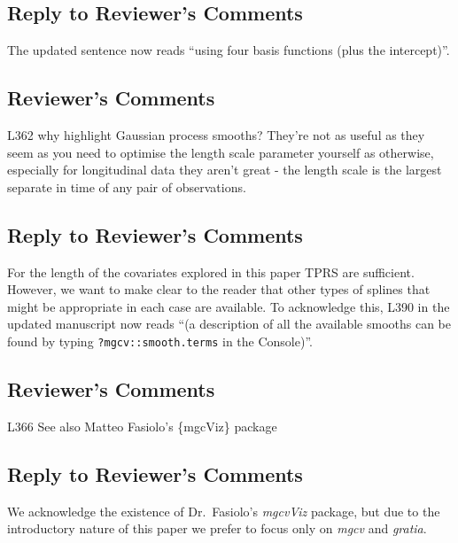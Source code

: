 \documentclass[
]{article}
\newcommand{\passthrough}[1]{#1}
\begin{document}
\hypertarget{section-25}{%
\subsection{\texorpdfstring{\textcolor{reviewersblue} {Reply to Reviewer's Comments}}{}}\label{section-25}}

The updated sentence now reads ``using four basis functions (plus the intercept)''.

\hypertarget{reviewers-comments-26}{%
\subsection{Reviewer's Comments}\label{reviewers-comments-26}}

L362 why highlight Gaussian process smooths? They're not as useful as they seem as you need to optimise the length scale parameter yourself as otherwise, especially for longitudinal data they aren't great - the length scale is the largest separate in time of any pair of observations.

\hypertarget{section-26}{%
\subsection{\texorpdfstring{\textcolor{reviewersblue} {Reply to Reviewer's Comments}}{}}\label{section-26}}

For the length of the covariates explored in this paper TPRS are sufficient. However, we want to make clear to the reader that other types of splines that might be appropriate in each case are available. To acknowledge this, L390 in the updated manuscript now reads ``(a description of all the available smooths can be found by typing \passthrough{\lstinline!?mgcv::smooth.terms!} in the Console)''.

\hypertarget{reviewers-comments-27}{%
\subsection{Reviewer's Comments}\label{reviewers-comments-27}}

L366 See also Matteo Fasiolo's \{mgcViz\} package

\hypertarget{section-27}{%
\subsection{\texorpdfstring{\textcolor{reviewersblue} {Reply to Reviewer's Comments}}{}}\label{section-27}}

We acknowledge the existence of Dr.~Fasiolo's \emph{mgcvViz} package, but due to the introductory nature of this paper we prefer to focus only on \emph{mgcv} and \emph{gratia}.
\end{document}
